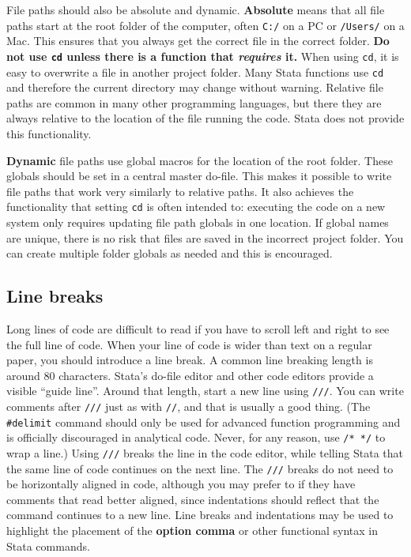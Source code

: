 File paths should also be absolute and dynamic. \textbf{Absolute} means that all
file paths start at the root folder of the computer,
often \texttt{C:/} on a PC or \texttt{/Users/} on a Mac.
This ensures that you always get the correct file in the correct folder.
\textbf{Do not use \texttt{cd} unless there is a function that \textit{requires} it.}
When using \texttt{cd}, it is easy to overwrite a file in another project folder.
Many Stata functions use \texttt{cd} and therefore the current directory may change without warning.
Relative file paths are common in many other programming languages,
but there they are always relative to the location of the file running the code.
Stata does not provide this functionality.

\textbf{Dynamic} file paths use global macros for the location of the root folder.
These globals should be set in a central master do-file.
This makes it possible to write file paths that work very similarly to relative paths.
It also achieves the functionality that setting \texttt{cd} is often intended to:
executing the code on a new system only requires updating file path globals in one location.
If global names are unique, there is no risk that files are saved in the incorrect project folder.
You can create multiple folder globals as needed and this is encouraged.


\subsection{Line breaks}

Long lines of code are difficult to read if you have to scroll left and right to see the full line of code.
When your line of code is wider than text on a regular paper, you should introduce a line break.
A common line breaking length is around 80 characters.
Stata's do-file editor and other code editors provide a visible ``guide line''.
Around that length, start a new line using \texttt{///}.
You can write comments after \texttt{///} just as with \texttt{//}, and that is usually a good thing.
(The \texttt{\#delimit} command should only be used for advanced function programming
and is officially discouraged in analytical code.\cite{cox2005styleguide}
Never, for any reason, use \texttt{/* */} to wrap a line.)
Using \texttt{///} breaks the line in the code editor,
while telling Stata that the same line of code continues on the next line.
The \texttt{///} breaks do not need to be horizontally aligned in code,
although you may prefer to if they have comments that read better aligned,
since indentations should reflect that the command continues to a new line.
Line breaks and indentations may be used to highlight the placement
of the \textbf{option comma} or other functional syntax in Stata commands.

